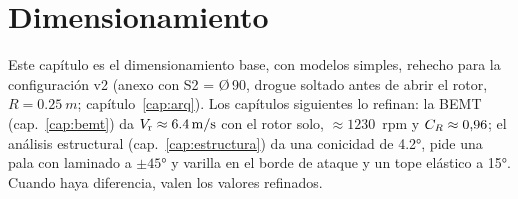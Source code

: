 \chapter{Dimensionamiento}\label{cap:dim}

\begin{nota}
Este capítulo es el dimensionamiento base, con modelos simples, rehecho para la
configuración v2 (anexo con S2 = Ø\,90, drogue soltado antes de abrir el rotor, $R=\SI{0.25}{m}$;
capítulo~\ref{cap:arq}). Los capítulos siguientes lo refinan: la BEMT (cap.~\ref{cap:bemt})
da $V_{\mathrm{r}}\approx\SI{6.4}{m/s}$ con el rotor solo, $\approx\num{1230}$~rpm y $C_{R}\approx0{,}96$; el
análisis estructural (cap.~\ref{cap:estructura}) da una conicidad de \ang{4.2}, pide una pala
con laminado a $\pm\ang{45}$ y varilla en el borde de ataque y un tope elástico a \ang{+15}.
Cuando haya diferencia, valen los valores refinados.
\end{nota}

